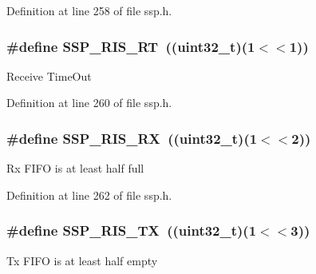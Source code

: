 Definition at line 258 of file ssp.\+h.

\subsubsection[{\texorpdfstring{S\+S\+P\+\_\+\+R\+I\+S\+\_\+\+RT}{SSP_RIS_RT}}]{\setlength{\rightskip}{0pt plus 5cm}\#define S\+S\+P\+\_\+\+R\+I\+S\+\_\+\+RT~(({\bf uint32\+\_\+t})(1$<$$<$1))}\hypertarget{group___s_s_p___private___macros_gaf3ca75688f2b02dc4df0c1812d246baf}{}\label{group___s_s_p___private___macros_gaf3ca75688f2b02dc4df0c1812d246baf}
Receive Time\+Out 

Definition at line 260 of file ssp.\+h.

\subsubsection[{\texorpdfstring{S\+S\+P\+\_\+\+R\+I\+S\+\_\+\+RX}{SSP_RIS_RX}}]{\setlength{\rightskip}{0pt plus 5cm}\#define S\+S\+P\+\_\+\+R\+I\+S\+\_\+\+RX~(({\bf uint32\+\_\+t})(1$<$$<$2))}\hypertarget{group___s_s_p___private___macros_gad5b9b44272a78e2dcfa4f11b560a1ac5}{}\label{group___s_s_p___private___macros_gad5b9b44272a78e2dcfa4f11b560a1ac5}
Rx F\+I\+FO is at least half full 

Definition at line 262 of file ssp.\+h.

\subsubsection[{\texorpdfstring{S\+S\+P\+\_\+\+R\+I\+S\+\_\+\+TX}{SSP_RIS_TX}}]{\setlength{\rightskip}{0pt plus 5cm}\#define S\+S\+P\+\_\+\+R\+I\+S\+\_\+\+TX~(({\bf uint32\+\_\+t})(1$<$$<$3))}\hypertarget{group___s_s_p___private___macros_gaf2019e37460395bc0ee5fe12cd6e2226}{}\label{group___s_s_p___private___macros_gaf2019e37460395bc0ee5fe12cd6e2226}
Tx F\+I\+FO is at least half empty 

